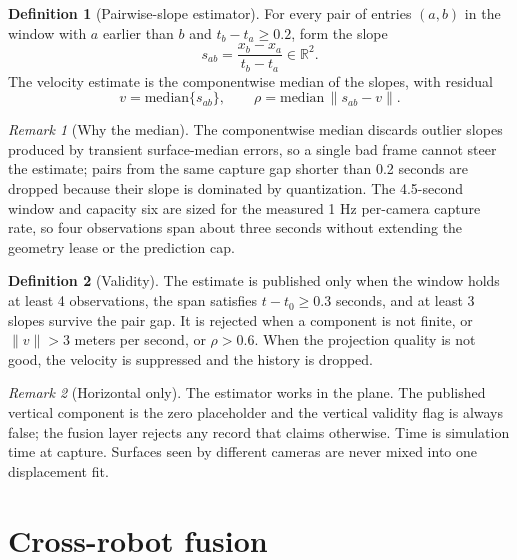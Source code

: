 \documentclass[10pt,a4paper]{article}
\theoremstyle{plain}
\theoremstyle{definition}
\newtheorem{definition}{Definition}[section]
\theoremstyle{remark}
\newtheorem{remark}{Remark}[section]
\begin{document}
\begin{definition}[Pairwise-slope estimator]\label{def:slopes}
For every pair of entries $(a, b)$ in the window with $a$ earlier than $b$ and $t_b - t_a \ge 0.2$, form the slope
\begin{equation}
s_{ab} = \frac{x_b - x_a}{t_b - t_a} \in \mathbb{R}^2 .
\end{equation}
The velocity estimate is the componentwise median of the slopes, with residual
\begin{equation}
v = \mathrm{median}\{s_{ab}\}, \qquad \rho = \mathrm{median}\,\|s_{ab} - v\|.
\end{equation}
\end{definition}

\begin{remark}[Why the median]\label{rem:median}
The componentwise median discards outlier slopes produced by transient surface-median errors, so a single bad frame cannot steer the estimate; pairs from the same capture gap shorter than 0.2 seconds are dropped because their slope is dominated by quantization. The 4.5-second window and capacity six are sized for the measured 1 Hz per-camera capture rate, so four observations span about three seconds without extending the geometry lease or the prediction cap.
\end{remark}

\begin{definition}[Validity]\label{prop:velvalid}
The estimate is published only when the window holds at least 4 observations, the span satisfies $t - t_0 \ge 0.3$ seconds, and at least 3 slopes survive the pair gap. It is rejected when a component is not finite, or $\|v\| > 3$ meters per second, or $\rho > 0.6$. When the projection quality is not good, the velocity is suppressed and the history is dropped.
\end{definition}

\begin{remark}[Horizontal only]\label{rem:planaronly}
The estimator works in the plane. The published vertical component is the zero placeholder and the vertical validity flag is always false; the fusion layer rejects any record that claims otherwise. Time is simulation time at capture. Surfaces seen by different cameras are never mixed into one displacement fit.
\end{remark}

\section{Cross-robot fusion}
\end{document}
